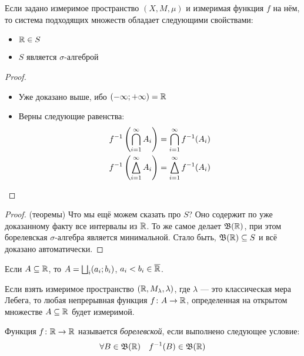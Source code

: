\begin{proposition}
	Если задано измеримое пространство $(X, M, \mu)$ и измеримая функция $f$ на нём, то система подходящих множеств обладает следующими свойствами:
	\begin{itemize}
		\item $\mathbb{R} \in S$
		
		\item $S$ является $\sigma$-алгеброй
	\end{itemize}
\end{proposition}

\begin{proof}~
	\begin{itemize}
		\item Уже доказано выше, ибо $(-\infty; +\infty) = \mathbb{R}$
		
		\item Верны следующие равенства:
		\begin{align*}
			&{f^{-1}\left(\bigcap_{i = 1}^\infty A_i\right) = \bigcap_{i = 1}^\infty f^{-1}(A_i)}
			\\
			&{f^{-1}\left(\bigtriangleup_{i = 1}^\infty A_i\right) = \bigtriangleup_{i = 1}^\infty f^{-1}(A_i)}
		\end{align*}
	\end{itemize}
\end{proof}

\begin{proof} (теоремы)
	Что мы ещё можем сказать про $S$? Оно содержит по уже доказанному факту все интервалы из $\mathbb{R}$. То же самое делает $\mathfrak{B}(\mathbb{R})$, при этом борелевская $\sigma$-алгебра является минимальной. Стало быть, $\mathfrak{B}(\mathbb{R}) \subseteq S$ и всё доказано автоматически.
\end{proof}

\begin{reminder}
	Если $A \subseteq \mathbb{R}$, то $A = \bigsqcup_i (a_i; b_i)$, $a_i < b_i \in \overline{\mathbb{R}}$.
\end{reminder}

\begin{reminder}
	Если взять измеримое пространство $(\mathbb{R}, M_\lambda, \lambda)$, где $\lambda$ --- это классическая мера Лебега, то любая непрерывная функция $f \colon A \to \mathbb{R}$, определенная на открытом множестве $A \subseteq \mathbb{R}$ будет измеримой.
\end{reminder}

\begin{definition}
	Функция $f \colon \mathbb{R} \to \mathbb{R}$ называется \textit{борелевской}, если выполнено следующее условие:
	\[
		\forall B \in \mathfrak{B}(\mathbb{R}) \quad f^{-1}(B) \in \mathfrak{B}(\mathbb{R})
	\]
\end{definition}

